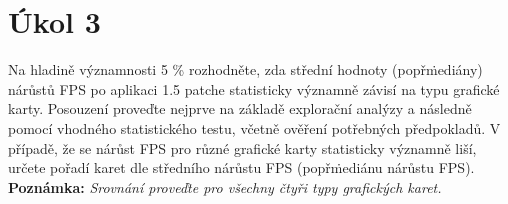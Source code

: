 \section*{Úkol 3}
\label{sec:task-3}

Na hladině významnosti 5 \% rozhodněte, zda střední hodnoty (popř\. mediány) nárůstů FPS po aplikaci 1.5 patche statisticky významně závisí na typu grafické karty.
Posouzení proveďte nejprve na základě explorační analýzy a následně pomocí vhodného statistického testu, včetně ověření potřebných předpokladů.
V případě, že se nárůst FPS pro různé grafické karty statisticky významně liší, určete pořadí karet dle středního nárůstu FPS (popř\. mediánu nárůstu FPS).
\textbf{Poznámka:} \textit{Srovnání proveďte pro všechny čtyři typy grafických karet.}

\renewcommand{\skewnessValues}{-0.2, 0.2, 0.2, -0.4}
\renewcommand{\kurtosisValues}{-1.1, -1.0, -1.1, -0.7}
\renewcommand{\shapireWilk}   {0.012, 0.006, 0.005, 0.019}
\renewcommand{\symmetryTest}  {0.087, 0.218, 0.043, 0.016}

\renewcommand{\meanValues}{5.200, 5.700, 4.750, 5.300}
\renewcommand{\ttRtxValues} {4.950, 5.250, 5.600, 5.850}
\renewcommand{\ttAmdValues} {4.700, 4.900, 5.100, 5.345}
\renewcommand{\rtxDvaInterval} {(\tableValue{\ttRtxValues}{0}, \tableValue{\ttRtxValues}{1}) }
\renewcommand{\rtxTriInterval} {(\tableValue{\ttRtxValues}{2}, \tableValue{\ttRtxValues}{3}) }
\renewcommand{\amdSestInterval} {(\tableValue{\ttAmdValues}{0}, \tableValue{\ttAmdValues}{1}) }
\renewcommand{\amdSedmInterval} {(\tableValue{\ttAmdValues}{2}, \tableValue{\ttAmdValues}{3}) }

